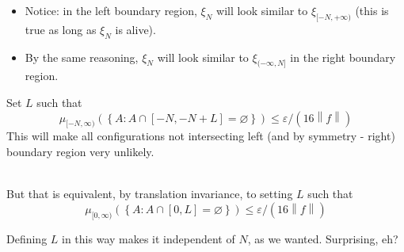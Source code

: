 \documentclass{beamer}
\newcommand{\norm}[1]{{\left\lVert#1\right\rVert}}
\begin{document}
\begin{frame}
    \begin{itemize}
        \item Notice: in the left boundary region, $\xi_N$ will look similar to $\xi_{[-N, +\infty)}$ (this is true as long as $\xi_N$ is alive).
        \item <2-> By the same reasoning, $\xi_N$ will look similar to $\xi_{(-\infty, N]}$ in the right boundary region.
    \end{itemize}

     {
        Set $L$ such that
        \[
            \mu_{[-N, \infty)}\left( \left\{ A : A \cap [-N,-N+L] = \varnothing \right\} \right)  \leq \varepsilon/(16\norm{f})
        \]
        This will make all configurations not intersecting left (and by symmetry - right) boundary region very unlikely.    
    }
    \\~\\
     {
        But that is equivalent, by translation invariance, to setting $L$ such that
        \[
            \mu_{[0, \infty)}\left( \left\{ A : A \cap [0,L] = \varnothing \right\} \right) \leq \varepsilon/(16\norm{f})
        \]
        
    }
     {
        Defining $L$ in this way makes it independent of $N$, as we wanted. Surprising, eh?
    }
\end{frame}

\end{document}
